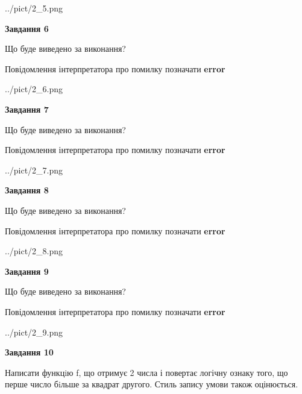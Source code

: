 \documentclass[12pt, ukrainian]{article}
\begin{document}
{\begin {large}
\begin{center}
	{../pict/2_5.png}
\end{center}
\newpage

{\begin {center}\textbf{Завдання 6}\end {center}}\par
Що буде виведено за виконання? \par
Повідомлення інтерпретатора про помилку позначати \textbf{error}

\begin{center}
	{../pict/2_6.png}
\end{center}
\newpage

{\begin {center}\textbf{Завдання 7}\end {center}}\par
Що буде виведено за виконання? \par
Повідомлення інтерпретатора про помилку позначати \textbf{error}

\begin{center}
	{../pict/2_7.png}
\end{center}
\newpage

{\begin {center}\textbf{Завдання 8}\end {center}}\par
Що буде виведено за виконання? \par
Повідомлення інтерпретатора про помилку позначати \textbf{error}

\begin{center}
	{../pict/2_8.png}
\end{center}
\newpage

{\begin {center}\textbf{Завдання 9}\end {center}}\par
Що буде виведено за виконання? \par
Повідомлення інтерпретатора про помилку позначати \textbf{error}

\begin{center}
	{../pict/2_9.png}
\end{center}
\newpage

{\begin {center}\textbf{Завдання 10}\end {center}}\par

Написати функцiю f, що отримує 2 числа і повертає логічну ознаку того, що перше число бiльше за квадрат другого. Стиль запису умови також оцінюється.\par
\newpage

\end {large}}
\end{document}
